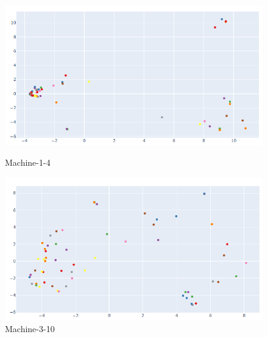 \begin{figure}[]
  \centering
  \begin{minipage}[b]{0.45\textwidth}
    \includegraphics[width=\textwidth]{images/model_centrality_good2-8_2}
    \caption{Machine-1-4}
     \label{model-centrality-plot-good}
  \end{minipage}
  \begin{minipage}[b]{0.45\textwidth}
    \includegraphics[width=\textwidth]{images/model_centrality_bad3-10_2}
    \caption{Machine-3-10}
      \label{model-centrality-plot-bad}
  \end{minipage}
\end{figure}


